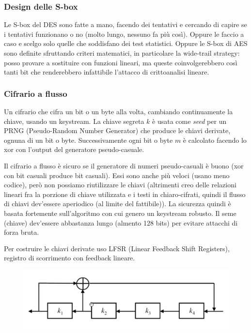 \subsubsection*{Design delle S-box}
Le S-box del DES sono fatte a mano, facendo dei tentativi e cercando di capire se i tentativi funzionano o no (molto lungo, nessuno fa più così).
Oppure le faccio a caso e scelgo solo quelle che soddisfano dei test statistici.
Oppure le S-box di AES sono definite sfruttando criteri matematici, in particolare la wide-trail strategy: posso provare a sostituire con funzioni lineari, ma queste coinvolgerebbero così tanti bit che renderebbero infattibile l'attacco di crittoanalisi lineare.


\subsubsection*{Cifrario a flusso}
Un cifrario che cifra un bit o un byte alla volta, cambiando continuamente la chiave, usando un keystream. La chiave segreta $k$ è usata come \textit{seed} per un PRNG (Pseudo-Random Number Generator) che produce le chiavi derivate, ognuna di un bit o byte.
Successivamente ogni bit o byte $m$ è calcolato facendo lo xor con l'output del generatore pseudo-casuale.

Il cifrario a flusso è sicuro se il generatore di numeri pseudo-casuali è buono (xor con bit casuali produce bit casuali).
Essi sono anche più veloci (usano meno codice), però non possiamo riutilizzare le chiavi (altrimenti creo delle relazioni lineari fra la porzione di chiave utilizzata e i testi in chiaro-cifrati, quindi il flusso di chiavi dev'essere aperiodico (al limite del fattibile)).
La sicurezza quindi è basata fortemente sull'algoritmo con cui genero un keystream robusto. Il seme (chiave) dev'essere abbastanza lungo (almento 128 bits) per evitare attacchi di forza bruta.

Per costruire le chiavi derivate uso LFSR (Linear Feedback Shift Registers), registro di scorrimento con feedback lineare. 

\begin{figure}[h]
	\centering
	\includegraphics[width=0.85\linewidth]{immagini/img46}
\end{figure}


